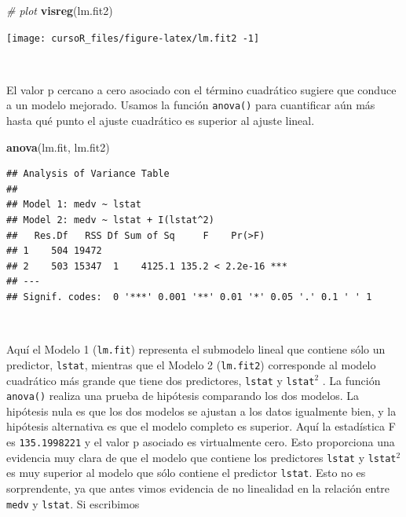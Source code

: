\documentclass[]{book}
\newenvironment{Shaded}{\begin{snugshade}}{\end{snugshade}}
\newcommand{\KeywordTok}[1]{\textcolor[rgb]{0.13,0.29,0.53}{\textbf{#1}}}
\newcommand{\CommentTok}[1]{\textcolor[rgb]{0.56,0.35,0.01}{\textit{#1}}}
\newcommand{\NormalTok}[1]{#1}
\begin{document}
\begin{Shaded}
\begin{Highlighting}[]
\CommentTok{# plot}
\KeywordTok{visreg}\NormalTok{(lm.fit2)}
\end{Highlighting}
\end{Shaded}

\begin{center}\texttt{[image: cursoR\_files/figure-latex/lm.fit2 -1]} \end{center}

~

El valor p cercano a cero asociado con el término cuadrático sugiere que
conduce a un modelo mejorado. Usamos la función \texttt{anova()} para
cuantificar aún más hasta qué punto el ajuste cuadrático es superior al
ajuste lineal.

\begin{Shaded}
\begin{Highlighting}[]
\KeywordTok{anova}\NormalTok{(lm.fit, lm.fit2)}
\end{Highlighting}
\end{Shaded}

\begin{verbatim}
## Analysis of Variance Table
## 
## Model 1: medv ~ lstat
## Model 2: medv ~ lstat + I(lstat^2)
##   Res.Df   RSS Df Sum of Sq     F    Pr(>F)    
## 1    504 19472                                 
## 2    503 15347  1    4125.1 135.2 < 2.2e-16 ***
## ---
## Signif. codes:  0 '***' 0.001 '**' 0.01 '*' 0.05 '.' 0.1 ' ' 1
\end{verbatim}

~

Aquí el Modelo 1 (\texttt{lm.fit}) representa el submodelo lineal que
contiene sólo un predictor, \texttt{lstat}, mientras que el Modelo 2
(\texttt{lm.fit2}) corresponde al modelo cuadrático más grande que tiene
dos predictores, \texttt{lstat} y \texttt{lstat}\(^2\) . La función
\texttt{anova()} realiza una prueba de hipótesis comparando los dos
modelos. La hipótesis nula es que los dos modelos se ajustan a los datos
igualmente bien, y la hipótesis alternativa es que el modelo completo es
superior. Aquí la estadística F es \texttt{135.1998221} y el valor p
asociado es virtualmente cero. Esto proporciona una evidencia muy clara
de que el modelo que contiene los predictores \texttt{lstat} y
\texttt{lstat}\(^2\) es muy superior al modelo que sólo contiene el
predictor \texttt{lstat}. Esto no es sorprendente, ya que antes vimos
evidencia de no linealidad en la relación entre \texttt{medv} y
\texttt{lstat}. Si escribimos
\end{document}
